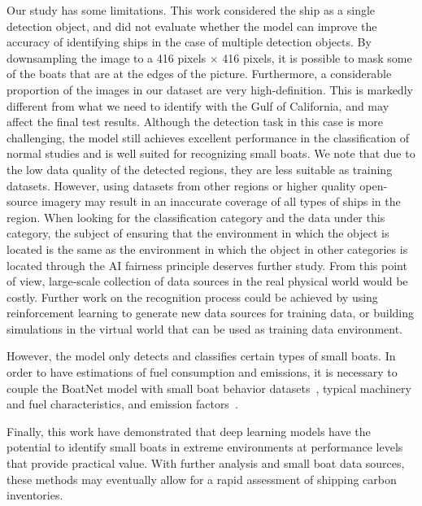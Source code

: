 Our study has some limitations. This work considered the ship as a single detection object, and did not evaluate whether the model can improve the accuracy of identifying ships in the case of multiple detection objects. By downsampling the image to a 416 pixels × 416 pixels, it is possible to mask some of the boats that are at the edges of the picture. Furthermore, a considerable proportion of the images in our dataset are very high-definition. This is markedly different from what we need to identify with the Gulf of California, and may affect the final test results. Although the detection task in this case is more challenging, the model still achieves excellent performance in the classification of normal studies and is well suited for recognizing small boats. We note that due to the low data quality of the detected regions, they are less suitable as training datasets. However, using datasets from other regions or higher quality open-source imagery may result in an inaccurate coverage of all types of ships in the region. When looking for the classification category and the data under this category, the subject of ensuring that the environment in which the object is located is the same as the environment in which the object in other categories is located through the AI fairness principle deserves further study. From this point of view, large-scale collection of data sources in the real physical world would be costly. Further work on the recognition process could be achieved by using reinforcement learning to generate new data sources for training data, or building simulations in the virtual world that can be used as training data environment.

However, the model only detects and classifies certain types of small boats. In order to have estimations of fuel consumption and emissions, it is necessary to couple the BoatNet model with small boat behavior datasets~\cite{ferrer2021mexican}, typical machinery and fuel characteristics, and emission factors~\cite{inecc2020inventario}. 

Finally, this work have demonstrated that deep learning models have the potential to identify small boats in extreme environments at performance levels that provide practical value. With further analysis and small boat data sources, these methods may eventually allow for a rapid assessment of shipping carbon inventories.